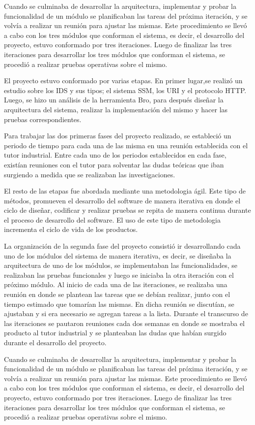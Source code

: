 Cuando se culminaba de desarrollar la arquitectura, implementar y probar la funcionalidad de un módulo se planificaban las tareas del próxima iteración, y se volvía a realizar un reunión para ajustar las mismas. Este procedimiento se llevó a cabo con los tres módulos que conforman el sistema, es decir, el desarrollo del proyecto, estuvo conformado por tres iteraciones. 
Luego de  finalizar las tres iteraciones para desarrollar los tres módulos que conforman el sistema, se procedió a realizar pruebas operativas sobre el mismo.

El proyecto estuvo conformado por varias etapas. En primer lugar,se realizó un estudio sobre los IDS y sus tipos; el sistema SSM, los URI y el protocolo HTTP. Luego, se hizo un análisis de la herramienta Bro, para después diseñar la arquitectura del sistema, realizar la implementación del mismo y hacer las pruebas correspondientes.

Para trabajar las dos primeras fases del proyecto realizado, se estableció un periodo de tiempo para cada una de las misma en una reunión establecida con el tutor industrial.
Entre cada uno de los periodos establecidos en cada fase, existían reuniones con el tutor para solventar las dudas teóricas que iban surgiendo a medida que se realizaban las investigaciones.

El resto de las etapas fue abordada mediante una metodologia ágil. Este tipo de métodos,  promueven el desarrollo del software de manera iterativa en donde el ciclo de diseñar, codificar y realizar pruebas se repita de manera continua durante el proceso de desarrollo del software. El uso de este tipo de metodologia incrementa el ciclo de vida de los productos.

La organización de la segunda fase del proyecto consistió ir desarrollando cada uno de los módulos del sistema de manera iterativa, es decir, se diseñaba la arquitectura de uno de los módulos, se implementaban las funcionalidades, se realizaban las pruebas funcionales y luego se iniciaba la otra iteración con el próximo módulo. Al inicio de cada una de las iteraciones, se realizaba una reunión en donde se plantean las tareas que se debían realizar, junto con el tiempo estimado que tomarían las mismas. En dicha reunión se discutían, se ajustaban y si era necesario se agregan tareas a la lista.  Durante el transcurso de las  iteraciones se pautaron reuniones cada dos semanas en donde se mostraba el producto al tutor industrial y se planteaban las dudas que habían surgido durante el desarrollo del proyecto.

Cuando se culminaba de desarrollar la arquitectura, implementar y probar la funcionalidad de un módulo se planificaban las tareas del próxima iteración, y se volvía a realizar un reunión para ajustar las mismas. Este procedimiento se llevó a cabo con los tres módulos que conforman el sistema, es decir, el desarrollo del proyecto, estuvo conformado por tres iteraciones. 
Luego de  finalizar las tres iteraciones para desarrollar los tres módulos que conforman el sistema, se procedió a realizar pruebas operativas sobre el mismo.
